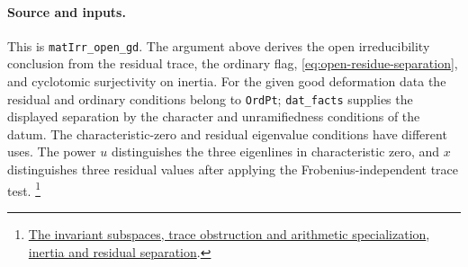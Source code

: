 \paragraph{Source and inputs.}
This is \texttt{matIrr\_open\_gd}. The argument above derives the open
irreducibility conclusion from the residual trace, the ordinary flag,
\eqref{eq:open-residue-separation}, and cyclotomic surjectivity on
inertia. For the given good deformation data the residual and ordinary
conditions belong to \texttt{OrdPt}; \texttt{dat\_facts} supplies the
displayed separation by the character and unramifiedness conditions
of the datum. The characteristic-zero and residual eigenvalue
conditions have different uses. The power $u$ distinguishes the
three eigenlines in characteristic zero, and $x$ distinguishes three
residual values after applying the Frobenius-independent trace test.
\footnote{\href{https://github.com/Deicyde/riemann-hypothesis/blob/40e56bab026552e089d7afcfeff08d2defb9c005/src/Development/AutomorphicArithmetic/AutomorphicVarieties/CurveDVRSpecialization/MatIrrOpenGd.lean}{The invariant subspaces, trace obstruction and arithmetic specialization},
\href{https://github.com/Deicyde/riemann-hypothesis/blob/40e56bab026552e089d7afcfeff08d2defb9c005/src/Development/AutomorphicArithmetic/AutomorphicVarieties/UnitaryThreeGroups/DatFacts.lean}{inertia and residual separation}.}
